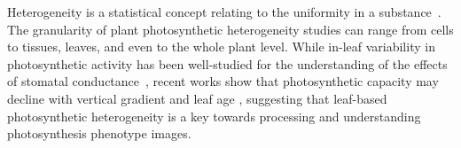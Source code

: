 \documentclass{bioinfo}
\begin{document}



Heterogeneity is a statistical concept relating to the uniformity in a substance~\citep{hall2003interpretation}. The granularity of %
plant photosynthetic heterogeneity studies can range from cells to tissues, leaves, and even to the whole plant level. While in-leaf variability in photosynthetic activity has been well-studied for the understanding of the effects of stomatal conductance~\citep{Cheeseman1991,Buckley1997}, recent works show that photosynthetic capacity may decline with vertical gradient and leaf age \citep{Kitajima2002,chen2008effect}, suggesting that leaf-based photosynthetic heterogeneity is a key towards processing and understanding photosynthesis phenotype images. %
\end{document}
